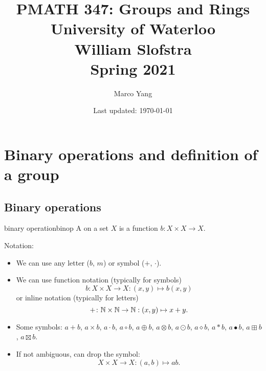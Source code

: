\documentclass[12pt,letterpaper]{report}
\begin{document}

\title{
  \Huge
  \textbf{PMATH 347: Groups and Rings} \\[\baselineskip]
  \large
  University of Waterloo \\
  William Slofstra \\
  Spring 2021
}
\author{Marco Yang}
\date{Last updated: \today}

{
  \sffamily
  \maketitle
}
\thispagestyle{empty}

\pagebreak
{}
\setcounter{page}{2}

{
  \sffamily
  \tableofcontents{\markboth{\contentsname}{}}
}

\pagebreak
{}


\section{Binary operations and definition of a group}

\subsection{Binary operations}

\begin{defn}{binary operation}{binop}
  A  on a set $X$ is a function $b \colon X \times X \to X$.
\end{defn}

Notation:
\begin{itemize}
  \item
  We can use any letter ($b$, $m$) or symbol ($+$, $\cdot$).
  \item
  We can use function notation (typically for symbols)
  \[ b \colon X \times X \to X : (x, y) \mapsto b(x, y) \]
  or inline notation (typically for letters)
  \[ + \colon \mathbb{N} \times \mathbb{N} \to \mathbb{N} : (x, y) \mapsto x + y. \]
  \item
  Some symbols: $a + b$, $a \times b$, $a \cdot b$, $a \circ b$, $a \oplus b$, $a \otimes b$,
  $a \odot b$, $a \diamond b$, $a * b$, $a \bullet b$, $a \boxplus b$, $a \boxtimes b$.
  \item
  If not ambiguous, can drop the symbol:
  \[ X \times X \to X : (a, b) \mapsto ab. \]
\end{itemize}
\end{document}
